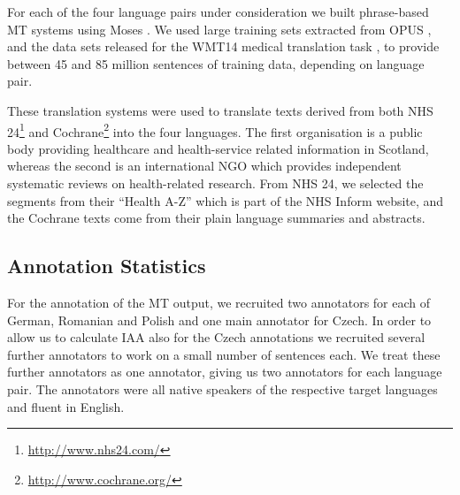 \documentclass[11pt]{article}
\newcommand{\oa}[1]{}
\newcommand{\bh}[1]{}
\begin{document}
For each of the four language pairs under consideration  we built phrase-based MT systems
using Moses \cite{Koehn:2007}. We used large training sets extracted from OPUS \cite{tiedemann:2009}, and
the data sets released for the WMT14 medical translation task \cite{bojar-EtAl:2014:W14-33}, to provide between
45 and 85 million sentences of training data, depending on language pair\oa{I think we should probably
  say how many in each.}.

These translation systems were used to translate texts derived from both NHS 24\footnote{\url{http://www.nhs24.com/}} and Cochrane\footnote{\url{http://www.cochrane.org/}} into the four languages. The first organisation is a public body providing healthcare and health-service related information in Scotland, whereas the second is an international NGO which 
provides independent systematic reviews on health-related research. From NHS 24, we selected the segments from their
``Health A-Z'' which is part of the NHS Inform website, and the Cochrane texts come from their plain language summaries
and abstracts.\bh{How much more do we need? Perhaps in the intro we could justify our focus on public health text
(accuracy!). The test corpora should have a public URL by the time we submit, although of course the source texts were 
already public anyway, and Lexi did some selection of examples for use in this expt. -- do we have to explain this?}

\subsection{Annotation Statistics}
\label{sec:annot_stats}

For the annotation of the MT output, we recruited two annotators for each of German, Romanian
and Polish and one main annotator for Czech. In order to allow us to calculate IAA also for
the Czech annotations we recruited several further annotators to work on a small number of 
sentences each. We treat these further annotators as one annotator, giving us two annotators
for each language pair.
The annotators were all native  speakers of the respective target languages and fluent in English.
\end{document}
